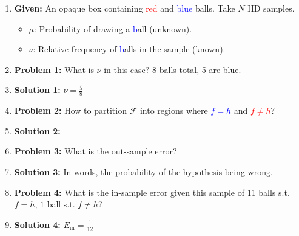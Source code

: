 \begin{example}
    \begin{enumerate}
        \item \textbf{Given:} An opaque box containing \textcolor{red}{red} and \textcolor{blue}{blue} balls. Take $N$ IID samples.
        \begin{itemize}
            \item $\mu$: Probability of drawing a \textcolor{blue} ball (unknown).
            \item $\nu$: Relative frequency of \textcolor{blue} balls in the sample (known).
        \end{itemize}
        \item \textbf{Problem 1:} What is $\nu$ in this case? 8 balls total, 5 are blue. 
        \item \textbf{Solution 1:} $\nu = \frac{5}{8}$
        \item \textbf{Problem 2:} How to partition $\mathcal{F}$ into regions where \textcolor{blue}{$f=h$} and \textcolor{red}{$f \neq h$}?
        \item \textbf{Solution 2:} 
        \item \textbf{Problem 3:} What is the out-sample error?
        \item \textbf{Solution 3:} In words, the probability of the hypothesis being wrong.
        \item \textbf{Problem 4:} What is the in-sample error given this sample of 11 balls s.t. $f=h$, $1$ ball s.t. $f \neq h$?
        \item \textbf{Solution 4:} $E_{\text{in}} = \frac{1}{12}$
        
    \end{enumerate}
\end{example}



